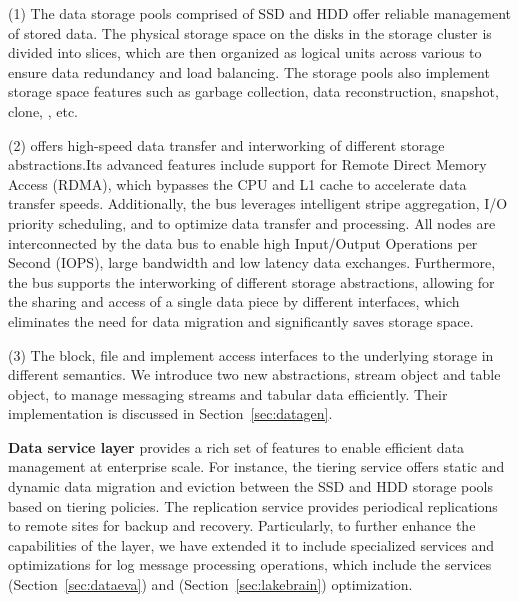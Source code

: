 (1) The data storage pools comprised of SSD and HDD offer reliable management of stored data.
The physical storage space on the disks in the storage cluster is divided into slices, which are then organized as logical units across various  to ensure data redundancy and load balancing. The storage pools also implement storage space features such as garbage collection, data reconstruction, snapshot, clone, , etc. 



(2)  offers high-speed data transfer and interworking of different storage abstractions.Its advanced features include support for Remote Direct Memory Access (RDMA), which bypasses the CPU and L1 cache to accelerate data transfer speeds. Additionally, the bus leverages intelligent stripe aggregation, I/O priority scheduling, and  to optimize data transfer and processing.
All nodes are interconnected by the data bus to enable high  Input/Output Operations per Second (IOPS), large bandwidth and low latency data exchanges. Furthermore, the bus supports the interworking of different storage abstractions, allowing for the sharing and  access of a single data piece by different interfaces, which eliminates the need for data migration and significantly saves storage space.

(3) The block, file and  implement access interfaces to the underlying storage in different semantics. We introduce two new abstractions, stream object and table object, to manage messaging streams and tabular data efficiently. 
Their implementation is discussed in Section~\ref{sec:datagen}.


\noindent \textbf{Data service layer} provides a rich set of features to enable efficient data management at enterprise scale. For instance, the tiering service offers static and dynamic data migration and eviction between the SSD and HDD storage pools based on tiering policies. The replication service provides periodical replications to remote sites for backup and recovery.
 Particularly, to further enhance the capabilities of the layer, we have extended it to include specialized services and optimizations for log message processing operations, which include the \sys  services (Section~\ref{sec:dataeva}) and \brain (Section~\ref{sec:lakebrain}) optimization.
 
